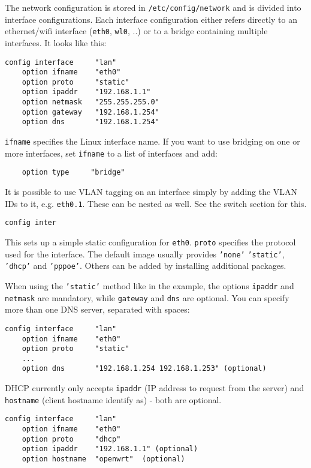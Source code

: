 The network configuration is stored in \texttt{/etc/config/network}
and is divided into interface configurations.
Each interface configuration either refers directly to an ethernet/wifi
interface (\texttt{eth0}, \texttt{wl0}, ..) or to a bridge containing multiple interfaces.
It looks like this:

\begin{Verbatim}
config interface     "lan"
    option ifname    "eth0"
    option proto     "static"
    option ipaddr    "192.168.1.1"
    option netmask   "255.255.255.0"
    option gateway   "192.168.1.254"
    option dns       "192.168.1.254"
\end{Verbatim}

\texttt{ifname} specifies the Linux interface name.
If you want to use bridging on one or more interfaces, set \texttt{ifname} to a list
of interfaces and add:
\begin{Verbatim}
    option type     "bridge"
\end{Verbatim}

It is possible to use VLAN tagging on an interface simply by adding the VLAN IDs
to it, e.g. \texttt{eth0.1}. These can be nested as well. See the switch section for
this.

\begin{Verbatim}
config inter
\end{Verbatim}

This sets up a simple static configuration for \texttt{eth0}. \texttt{proto} specifies the
protocol used for the interface. The default image usually provides \texttt{'none'}
\texttt{'static'}, \texttt{'dhcp'} and \texttt{'pppoe'}. Others can be added by installing additional
packages.

When using the \texttt{'static'} method like in the example, the  options \texttt{ipaddr} and
\texttt{netmask} are mandatory, while \texttt{gateway} and \texttt{dns} are optional.
You can specify more than one DNS server, separated with spaces:

\begin{Verbatim}
config interface     "lan"
    option ifname    "eth0"
    option proto     "static"
    ...
    option dns       "192.168.1.254 192.168.1.253" (optional)
\end{Verbatim}

DHCP currently only accepts \texttt{ipaddr} (IP address to request from the server)
and \texttt{hostname} (client hostname identify as) - both are optional.

\begin{Verbatim}
config interface     "lan"
    option ifname    "eth0"
    option proto     "dhcp"
    option ipaddr    "192.168.1.1" (optional)
    option hostname  "openwrt"	(optional)
\end{Verbatim}

